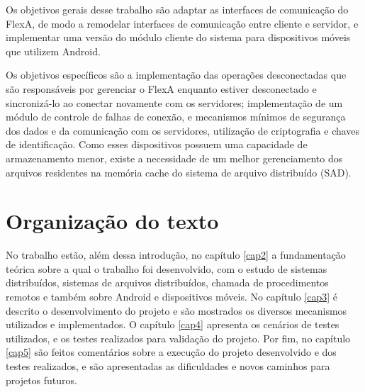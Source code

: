     Os objetivos gerais desse trabalho são adaptar as interfaces de comunicação do FlexA, de modo a remodelar interfaces de comunicação entre cliente e servidor, e implementar uma versão do módulo cliente do sistema para dispositivos móveis que utilizem Android.

    Os objetivos específicos são a implementação das operações desconectadas que são responsáveis por gerenciar o FlexA enquanto estiver desconectado e sincronizá-lo ao conectar novamente com os servidores; implementação de um módulo de controle de falhas de conexão, e mecanismos mínimos de segurança dos dados e da comunicação com os servidores, utilização de criptografia e chaves de identificação. Como esses dispositivos possuem uma capacidade de armazenamento menor, existe a necessidade de um melhor gerenciamento dos arquivos residentes na memória cache do sistema de arquivo distribuído (SAD).

\section{Organização do texto}

    No trabalho estão, além dessa introdução, no capítulo \ref{cap2} a fundamentação teórica sobre a qual o trabalho foi desenvolvido, com o estudo de sistemas distribuídos, sistemas de arquivos distribuídos, chamada de procedimentos remotos e também sobre Android e dispositivos móveis. No capítulo \ref{cap3} é descrito o desenvolvimento do projeto e são mostrados os diversos mecanismos utilizados e implementados. O capítulo \ref{cap4} apresenta os cenários de testes utilizados, e os testes realizados para validação do projeto. Por fim, no capítulo \ref{cap5} são feitos comentários sobre a execução do projeto desenvolvido e dos testes realizados, e são apresentadas as dificuldades e novos caminhos para projetos futuros.
    